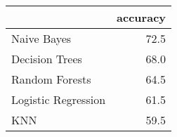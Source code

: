 \begin{tabular}{lr}
\toprule
{} &  accuracy \\
\midrule
Naive Bayes         &      72.5 \\
Decision Trees      &      68.0 \\
Random Forests      &      64.5 \\
Logistic Regression &      61.5 \\
KNN                 &      59.5 \\
\bottomrule
\end{tabular}

